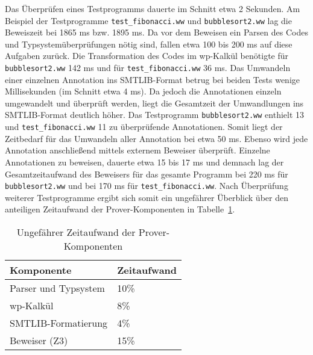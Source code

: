 Das Überprüfen eines Testprogramms dauerte im Schnitt etwa 2 Sekunden. Am Beispiel der Testprogramme \texttt{test\_fibonacci.ww} und \texttt{bubblesort2.ww} lag die Beweiszeit bei 1865 ms bzw. 1895 ms. Da vor dem Beweisen ein Parsen des Codes und Typsystemüberprüfungen nötig sind, fallen etwa 100 bis 200 ms auf diese Aufgaben zurück. Die Transformation des Codes im wp-Kalkül benötigte für \texttt{bubblesort2.ww} 142 ms und für \texttt{test\_fibonacci.ww} 36 ms. Das Umwandeln einer einzelnen Annotation ins SMTLIB-Format betrug bei beiden Tests wenige Millisekunden (im Schnitt etwa 4 ms). Da jedoch die Annotationen einzeln umgewandelt und überprüft werden, liegt die Gesamtzeit der Umwandlungen ins SMTLIB-Format deutlich höher. Das Testprogramm \texttt{bubblesort2.ww} enthielt 13 und \texttt{test\_fibonacci.ww} 11 zu überprüfende Annotationen. Somit liegt der Zeitbedarf für das Umwandeln aller Annotation bei etwa 50 ms. Ebenso wird jede Annotation anschließend mittels externem Beweiser überprüft. Einzelne Annotationen zu beweisen, dauerte etwa 15 bis 17 ms und demnach lag der Gesamtzeitaufwand des Beweisers für das gesamte Programm bei 220 ms für \texttt{bubblesort2.ww} und bei 170 ms für \texttt{test\_fibonacci.ww}. Nach Überprüfung weiterer Testprogramme ergibt sich somit ein ungefährer Überblick über den anteiligen Zeitaufwand der Prover-Komponenten in Tabelle~\ref{zeitaufwandprover}.

\begin{table}[h]
\centering
\caption{Ungefährer Zeitaufwand der Prover-Komponenten}
\label{zeitaufwandprover}
\begin{tabular}{|l|l|}
\hline
\textbf{Komponente} & \textbf{Zeitaufwand} \\
\hline
Parser und Typsystem & 10\% \\
\hline
wp-Kalkül & 8\% \\
\hline
SMTLIB-Formatierung & 4\% \\
\hline
Beweiser (Z3) & 15\% \\
\hline
\end{tabular}
\end{table}
